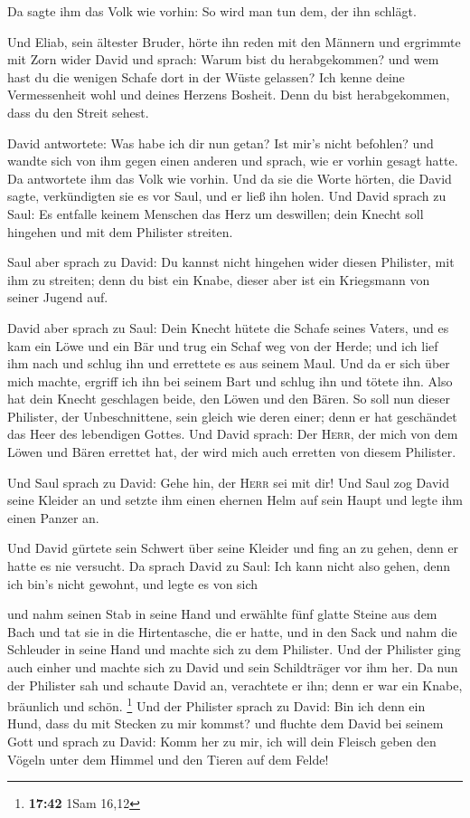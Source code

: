  Da sagte ihm das Volk wie vorhin: So wird man tun dem,
der ihn schlägt.

 Und Eliab, sein ältester Bruder, hörte ihn reden mit den
Männern und ergrimmte mit Zorn wider David und sprach: Warum bist du
herabgekommen? und wem hast du die wenigen Schafe dort in der Wüste
gelassen? Ich kenne deine Vermessenheit wohl und deines Herzens Bosheit.
Denn du bist herabgekommen, dass du den Streit sehest.

 David antwortete: Was habe ich dir nun getan? Ist mir's
nicht befohlen?  und wandte sich von ihm gegen einen
anderen und sprach, wie er vorhin gesagt hatte. Da antwortete ihm das
Volk wie vorhin.  Und da sie die Worte hörten, die David
sagte, verkündigten sie es vor Saul, und er ließ ihn holen.
 Und David sprach zu Saul: Es entfalle keinem Menschen
das Herz um deswillen; dein Knecht soll hingehen und mit dem Philister
streiten.

 Saul aber sprach zu David: Du kannst nicht hingehen
wider diesen Philister, mit ihm zu streiten; denn du bist ein Knabe,
dieser aber ist ein Kriegsmann von seiner Jugend auf.

 David aber sprach zu Saul: Dein Knecht hütete die Schafe
seines Vaters, und es kam ein Löwe und ein Bär und trug ein Schaf weg
von der Herde;  und ich lief ihm nach und schlug ihn und
errettete es aus seinem Maul. Und da er sich über mich machte, ergriff
ich ihn bei seinem Bart und schlug ihn und tötete ihn. 
Also hat dein Knecht geschlagen beide, den Löwen und den Bären. So soll
nun dieser Philister, der Unbeschnittene, sein gleich wie deren einer;
denn er hat geschändet das Heer des lebendigen Gottes. 
Und David sprach: Der \textsc{Herr}, der mich von dem Löwen und Bären
errettet hat, der wird mich auch erretten von diesem Philister.

 Und Saul sprach zu David: Gehe hin, der \textsc{Herr}
sei mit dir! Und Saul zog David seine Kleider an und setzte ihm einen
ehernen Helm auf sein Haupt und legte ihm einen Panzer an.

 Und David gürtete sein Schwert über seine Kleider und
fing an zu gehen, denn er hatte es nie versucht. Da sprach David zu
Saul: Ich kann nicht also gehen, denn ich bin's nicht gewohnt, und legte
es von sich

 und nahm seinen Stab in seine Hand und erwählte fünf
glatte Steine aus dem Bach und tat sie in die Hirtentasche, die er
hatte, und in den Sack und nahm die Schleuder in seine Hand und machte
sich zu dem Philister.  Und der Philister ging auch
einher und machte sich zu David und sein Schildträger vor ihm her.
 Da nun der Philister sah und schaute David an,
verachtete er ihn; denn er war ein Knabe, bräunlich und schön.
\footnote{\textbf{17:42} 1Sam 16,12}  Und der Philister
sprach zu David: Bin ich denn ein Hund, dass du mit Stecken zu mir
kommst? und fluchte dem David bei seinem Gott  und sprach
zu David: Komm her zu mir, ich will dein Fleisch geben den Vögeln unter
dem Himmel und den Tieren auf dem Felde!

